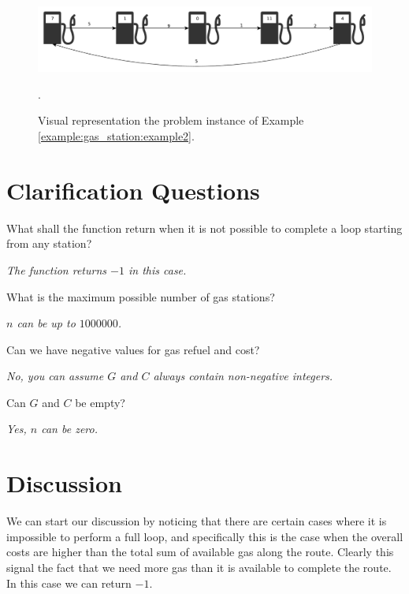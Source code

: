 \begin{figure}
	\centering
	\includegraphics[width=\textwidth]{sources/gas_station/images/example2}
	\caption[Implicit graph for the Example \ref{example:gas_station:example2}.]
	{Visual representation the problem instance of Example
	\ref{example:gas_station:example2}.}.
	\label{fig:gas_station:example2}
\end{figure}

\section{Clarification Questions}

\begin{QandA}
	\item What shall the function return when it is not possible to complete a loop starting from any station? 
	\begin{answered}
		\textit{The function returns $-1$ in this case.}
	\end{answered}

	\item What is the maximum possible number of gas stations?
	\begin{answered}
		\textit{$n$ can be up to $1000000$.}
	\end{answered}

	\item Can we have negative values for gas refuel and cost?
	\begin{answered}
		\textit{No, you can assume $G$ and $C$ always contain non-negative integers.}
	\end{answered}
	
	\item Can $G$ and $C$ be empty?
	\begin{answered}
		\textit{Yes, $n$ can be zero.}
	\end{answered}
\end{QandA}

\section*{Discussion}
\label{gas_station:sec:discussion}
We can start our discussion by noticing that there are certain cases where it is impossible to perform a full loop, and specifically this is the case when the overall costs are higher than the total sum of available gas along the route. 
Clearly this signal the fact that we need more gas than it is available to complete the route. In this case we can return $-1$.

